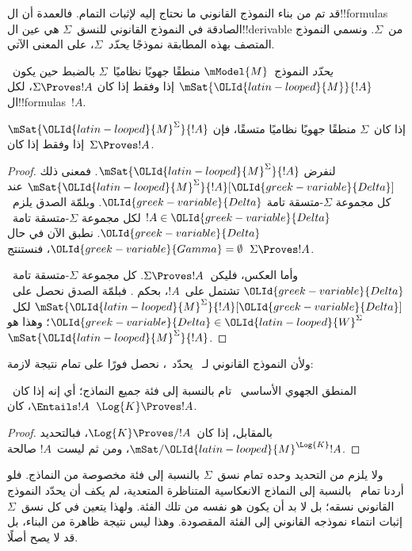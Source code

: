 \documentclass[../../../include/open-logic-section]{subfiles}
\begin{document}


قد تم من بناء النموذج القانوني ما نحتاج إليه لإثبات التمام.
فالعمدة أن ال!!{formula}s الصادقة في النموذج القانوني للنسق~$\Sigma$
هي عين ال!!{derivable} من~$\Sigma$.
ونسمي النموذج المتصف بهذه المطابقة نموذجًا \emph{يحدّد}~$\Sigma$،
على المعنى الآتي.

\begin{defn}
  \emph{يحدّد} النموذج~$\mModel{M}$ منطقًا جهويًا نظاميًا~$\Sigma$
  بالضبط حين يكون~$\mSat{\OLId{latin-looped}{M}}{!A}$ إذا وفقط إذا كان
  $\Sigma \Proves !A$، لكل ال!!{formula}s~$!A$.
\end{defn}

\begin{thm}[التحديد]
  إذا كان~$\Sigma$ منطقًا جهويًا نظاميًا متسقًا، فإن
  $\mSat{\OLId{latin-looped}{M}^\Sigma}{!A}$ إذا وفقط إذا كان~$\Sigma \Proves !A$.
\end{thm}

\begin{proof}
  لنفرض $\mSat{\OLId{latin-looped}{M}^\Sigma}{!A}$. فمعنى ذلك
  $\mSat{\OLId{latin-looped}{M}^\Sigma}{!A}[\OLId{greek-variable}{Delta}]$ عند كل مجموعة $\Sigma$-متسقة تامة
  $\OLId{greek-variable}{Delta}$. وبلمّة الصدق يلزم~$!A \in \OLId{greek-variable}{Delta}$ لكل مجموعة
  $\Sigma$-متسقة تامة~$\OLId{greek-variable}{Delta}$.
  نطبق الآن 
  في حال $ \OLId{greek-variable}{Gamma} = \emptyset$، فنستنتج~$\Sigma \Proves !A$.

  وأما العكس، فليكن~$\Sigma \Proves !A$.
  كل مجموعة $\Sigma$-متسقة تامة~$\OLId{greek-variable}{Delta}$ تشتمل على~$!A$،
  بحكم .
  فبلمّة الصدق نحصل على~$\mSat{\OLId{latin-looped}{M}^\Sigma}{!A}[\OLId{greek-variable}{Delta}]$ لكل~$\OLId{greek-variable}{Delta} \in
  \OLId{latin-looped}{W}^\Sigma$؛ وهذا هو~$\mSat{\OLId{latin-looped}{M}^\Sigma}{!A}$.
\end{proof}

ولأن النموذج القانوني لـ~ يحدّد~، نحصل فورًا على تمام
 نتيجة لازمة:

\begin{cor}
  المنطق الجهوي الأساسي~ تام بالنسبة إلى فئة جميع النماذج؛
  أي إنه إذا كان~$\Entails !A$، كان~$\Log{K} \Proves !A$.
\end{cor}

\begin{proof}
  بالمقابل، إذا كان~$\Log{K} \Proves/ !A$، فبالتحديد
  $\mSat/{\OLId{latin-looped}{M}^{\Log{K}}}{!A}$، ومن ثم ليست~$!A$ صالحة.
\end{proof}

ولا يلزم من التحديد وحده تمام نسق~$\Sigma$ بالنسبة إلى فئة مخصوصة
من النماذج. فلو أردنا تمام~ بالنسبة إلى النماذج الانعكاسية
المتناظرة المتعدية، لم يكف أن يحدّد النموذج القانوني نسقه؛ بل لا بد
أن يكون هو نفسه من تلك الفئة. ولهذا يتعين في كل نسق~$\Sigma$
إثبات انتماء نموذجه القانوني إلى الفئة المقصودة.
وهذا ليس نتيجة ظاهرة من البناء، بل قد لا يصح أصلًا.
\end{document}
